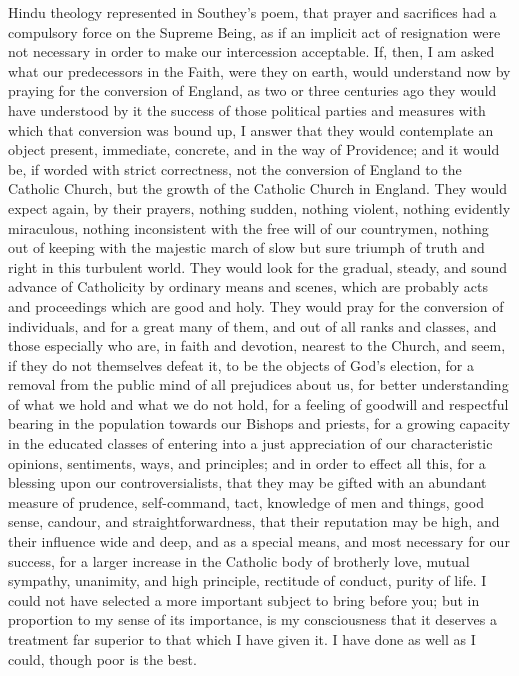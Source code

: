 Hindu theology represented in Southey's poem, that prayer and
sacrifices had a compulsory force on the Supreme Being, as if an
implicit act of resignation were not necessary in order to make our
intercession acceptable. If, then, I am asked what our predecessors in
the Faith, were they on earth, would understand now by praying for the
conversion of England, as two or three centuries ago they would have
understood by it the success of those political parties and measures
with which that conversion was bound up, I answer that they would
contemplate an object present, immediate, concrete, and in the way of
Providence; and it would be, if worded with strict correctness, not
the conversion of England to the Catholic Church, but the growth of
the Catholic Church in England. They would expect again, by their
prayers, nothing sudden, nothing violent, nothing evidently
miraculous, nothing inconsistent with the free will of our countrymen,
nothing out of keeping with the majestic march of slow but sure
triumph of truth and right in this turbulent world. They would look
for the gradual, steady, and sound advance of Catholicity by ordinary
means and scenes, which are probably acts and proceedings which are
good and holy. They would pray for the conversion of individuals, and
for a great many of them, and out of all ranks and classes, and those
especially who are, in faith and devotion, nearest to the Church, and
seem, if they do not themselves defeat it, to be the objects of
God's election, for a removal from the public mind of all prejudices
about us, for better understanding of what we hold and what we do not
hold, for a feeling of goodwill and respectful bearing in the
population towards our Bishops and priests, for a growing capacity in
the educated classes of entering into a just appreciation of our
characteristic opinions, sentiments, ways, and principles; and in
order to effect all this, for a blessing upon our controversialists,
that they may be gifted with an abundant measure of prudence,
self-command, tact, knowledge of men and things, good sense, candour,
and straightforwardness, that their reputation may be high, and their
influence wide and deep, and as a special means, and most necessary
for our success, for a larger increase in the Catholic body of
brotherly love, mutual sympathy, unanimity, and high principle,
rectitude of conduct, purity of life. I could not have selected a more
important subject to bring before you; but in proportion to my sense
of its importance, is my consciousness that it deserves a treatment
far superior to that which I have given it. I have done as well as I
could, though poor is the best.

